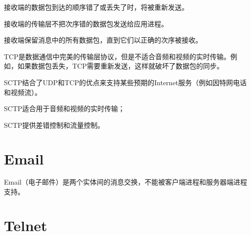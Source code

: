 \begin{compactitem}
\item 接收端的数据包到达的顺序错了或丢失了时，将被重新发送。
\item 接收端的传输层不把次序错的数据包发送给应用进程。
\item 接收端保留消息中的所有数据包，直到它们以正确的次序被接收。
\end{compactitem}

TCP是数据通信中完美的传输层协议，但是不适合音频和视频的实时传输。例如，如果数据包丢失，TCP需要重新发送，这样就破坏了数据包的同步。

SCTP结合了UDP和TCP的优点来支持某些预期的Internet服务（例如因特网电话和视频流）。

\begin{compactitem}
\item SCTP适合用于音频和视频的实时传输；
\item SCTP提供差错控制和流量控制。
\end{compactitem}








\chapter{Email}



Email（电子邮件）是两个实体间的消息交换，不能被客户端进程和服务器端进程支持。



\chapter{Telnet}



















































